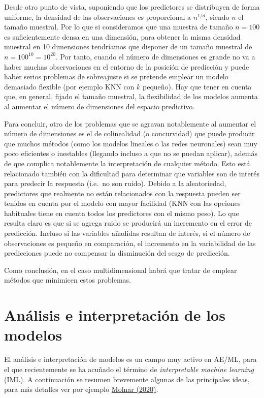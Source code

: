 \documentclass[
]{book}
\theoremstyle{break}
\theoremstyle{definition}
\theoremstyle{definition}
\theoremstyle{definition}
\theoremstyle{remark}
\begin{document}
Desde otro punto de vista, suponiendo que los predictores se distribuyen de forma uniforme, la densidad de las observaciones es proporcional a \(n^{1/d}\), siendo \(n\) el tamaño muestral.
Por lo que si consideramos que una muestra de tamaño \(n=100\) es suficientemente densa en una dimensión, para obtener la misma densidad muestral en 10 dimensiones tendríamos que disponer de un tamaño muestral de \(n = 100^{10} = 10^{20}\).
Por tanto, cuando el número de dimensiones es grande no va a haber muchas observaciones en el entorno de la posición de predicción y puede haber serios problemas de sobreajuste si se pretende emplear un modelo demasiado flexible (por ejemplo KNN con \(k\) pequeño). Hay que tener en cuenta que, en general, fijado el tamaño muestral, la flexibilidad de los modelos aumenta al aumentar el número de dimensiones del espacio predictivo.

Para concluir, otro de los problemas que se agravan notablemente al aumentar el número de dimensiones es el de colinealidad (o concurvidad) que puede producir que muchos métodos (como los modelos lineales o las redes neuronales) sean muy poco eficientes o inestables (llegando incluso a que no se puedan aplicar), además de que complica notablemente la interpretación de cualquier método.
Esto está relacionado también con la dificultad para determinar que variables son de interés para predecir la respuesta (i.e.~no son ruido).
Debido a la aleatoriedad, predictores que realmente no están relacionados con la respuesta pueden ser tenidos en cuenta por el modelo con mayor facilidad (KNN con las opciones habituales tiene en cuenta todos los predictores con el mismo peso).
Lo que resulta claro es que si se agrega ruido se producirá un incremento en el error de predicción.
Incluso si las variables añadidas resultan de interés, si el número de observaciones es pequeño en comparación, el incremento en la variabilidad de las predicciones puede no compensar la disminución del sesgo de predicción.

Como conclusión, en el caso multidimensional habrá que tratar de emplear métodos que minimicen estos problemas.

\hypertarget{analisis-modelos}{%
\section{Análisis e interpretación de los modelos}\label{analisis-modelos}}

El análisis e interpretación de modelos es un campo muy activo en AE/ML, para el que recientemente se ha acuñado el término de \emph{interpretable machine learning} (IML).
A continuación se resumen brevemente algunas de las principales ideas, para más detalles ver por ejemplo \href{https://christophm.github.io/interpretable-ml-book}{Molnar (2020)}.
\end{document}
